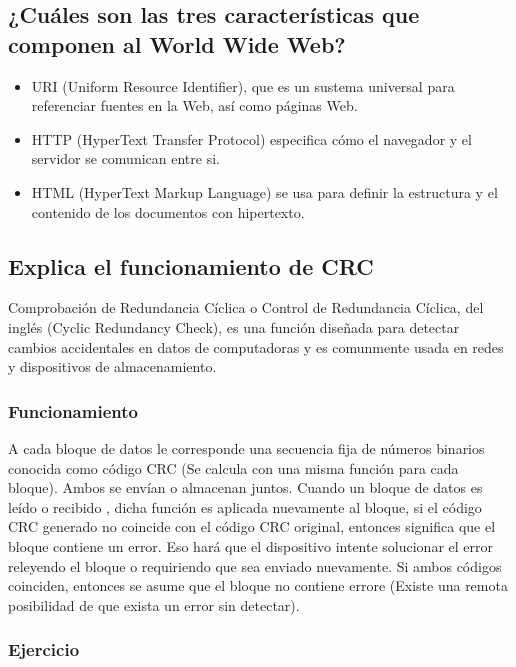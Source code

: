 \documentclass[spanish,12pt,letterpaper]{article}
\begin{document}
\subsection{¿Cuáles son las tres características que componen al World Wide Web?}

\begin{itemize}
\item URI (Uniform Resource Identifier), que es un sustema universal para
  referenciar fuentes en la Web, así como páginas Web.
  
\item HTTP (HyperText Transfer Protocol) especifica cómo el navegador y el
  servidor se comunican entre si.
\item HTML (HyperText Markup Language) se usa para definir la estructura y el
  contenido de los documentos con hipertexto.
\end{itemize}


\subsection{Explica el funcionamiento de CRC}

Comprobación de Redundancia Cíclica o Control de Redundancia Cíclica, del inglés
(Cyclic Redundancy Check), es una función diseñada para detectar cambios
accidentales en datos de computadoras y es comunmente usada en redes y
dispositivos de almacenamiento.

\subsubsection{Funcionamiento}
A cada bloque de datos le corresponde una secuencia fija de números binarios
conocida como código CRC (Se calcula con una misma función para cada bloque).
Ambos se envían o almacenan juntos. Cuando un bloque de datos es leído o recibido
, dicha función es aplicada nuevamente al bloque, si el código CRC generado no
coincide con el código CRC original, entonces significa que el bloque contiene
un error. Eso hará que el dispositivo intente solucionar el error releyendo el
bloque o requiriendo que sea enviado nuevamente. Si ambos códigos coinciden,
entonces se asume que el bloque no contiene errore (Existe una remota posibilidad
de que exista un error sin detectar).

\subsubsection{Ejercicio}
\end{document}

